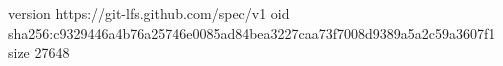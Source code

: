 version https://git-lfs.github.com/spec/v1
oid sha256:c9329446a4b76a25746e0085ad84bea3227caa73f7008d9389a5a2c59a3607f1
size 27648
